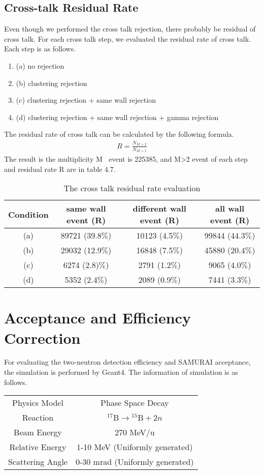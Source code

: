 \subsection{Cross-talk Residual Rate}
Even though we performed the cross talk rejection, there probably be residual of cross talk. For each cross talk step, we evaluated the residual rate of cross talk. Each step is as follows.
\begin{enumerate}
    \item (a) no rejection
    \item (b) clustering rejection
    \item (c) clustering rejection + same wall rejection
    \item (d) clustering rejection + same wall rejection + gamma rejection
\end{enumerate}
The residual rate of cross talk can be calculated by the following formula.
\begin{align}
    R = \frac{N_{M>2}}{N_{M>1}}
\end{align}
The result is the multiplicity M $\>$ event is 225385, and M>2 event of each step and residual rate R are in table 4.7.
\begin{table}[h]
    \centering
    \begin{tabular}[h]{c|c|c|c}
        \hline
        Condition & same wall event (R) & different wall event (R) & all wall event (R)\\
        \hline
        (a) & 89721 (39.8$\%$) & 10123 (4.5$\%$) & 99844 (44.3$\%$) \\
        (b) & 29032 (12.9$\%$) & 16848 (7.5$\%$) & 45880 (20.4$\%$)\\
        (c) & 6274 (2.8)$\%$)   & 2791 (1.2$\%$)& 9065 (4.0$\%$)\\
        (d) & 5352 (2.4$\%$)& 2089 (0.9$\%$)& 7441 (3.3$\%$)\\
        \hline
    \end{tabular}
    \caption{The cross talk residual rate evaluation}
\end{table}

\section{Acceptance and Efficiency Correction}
For evaluating the two-neutron detection efficiency and SAMURAI acceptance, the simulation is performed by Geant4. The information of simulation is as follows.

\begin{center}
    \begin{tabular}[h]{c|c}
        \hline
        Physics Model & Phase Space Decay \\
        Reaction & ${}^{17}\text{B} \to {}^{15}\text{B} + 2n$\\
        Beam Energy & 270 MeV/u\\
        Relative Energy & 1-10 MeV (Uniformly generated)\\
        Scattering Angle & 0-30 mrad (Uniformly generated)\\
        \hline
    \end{tabular}
\end{center}

